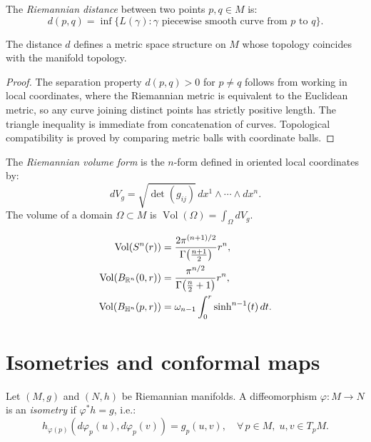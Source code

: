 \begin{definition}
The \emph{Riemannian distance} between two points $p, q \in M$ is:
\[
    d(p,q) = \inf \{ L(\gamma) : \gamma \text{ piecewise smooth curve from } p \text{ to } q \}.
\]
\end{definition}

\begin{theorem}
The distance $d$ defines a metric space structure on $M$ whose topology coincides
with the manifold topology.
\end{theorem}

\begin{proof}
The separation property $d(p,q) > 0$ for $p \neq q$ follows from working in
local coordinates, where the Riemannian metric is equivalent to the Euclidean
metric, so any curve joining distinct points has strictly positive length.
The triangle inequality is immediate from concatenation of curves. Topological
compatibility is proved by comparing metric balls with coordinate balls.
\end{proof}

\begin{definition}
The \emph{Riemannian volume form} is the $n$-form defined in oriented local
coordinates by:
\[
    dV_g = \sqrt{\det(g_{ij})} \, dx^1 \wedge \cdots \wedge dx^n.
\]
The volume of a domain $\Omega \subset M$ is $\operatorname{Vol}(\Omega) = \int_\Omega dV_g$.
\end{definition}

\begin{keyformulas}[title=\textbf{Volume formulas for model spaces}]
\begin{align*}
    \operatorname{Vol}(S^n(r)) &= \frac{2\pi^{(n+1)/2}}{\Gamma\!\left(\frac{n+1}{2}\right)} r^n, \\
    \operatorname{Vol}(B_{\mathbb{R}^n}(0,r)) &= \frac{\pi^{n/2}}{\Gamma\!\left(\frac{n}{2}+1\right)} r^n, \\
    \operatorname{Vol}(B_{\mathbb{H}^n}(p,r)) &= \omega_{n-1} \int_0^r \sinh^{n-1}(t)\, dt.
\end{align*}
\end{keyformulas}

\section{Isometries and conformal maps}

\begin{definition}[Isometry]
Let $(M, g)$ and $(N, h)$ be Riemannian manifolds. A diffeomorphism
$\varphi : M \to N$ is an \emph{isometry} if $\varphi^* h = g$, i.e.:
\[
    h_{\varphi(p)}(d\varphi_p(u), d\varphi_p(v)) = g_p(u, v),
    \quad \forall\, p \in M,\; u, v \in T_pM.
\]
\end{definition}

